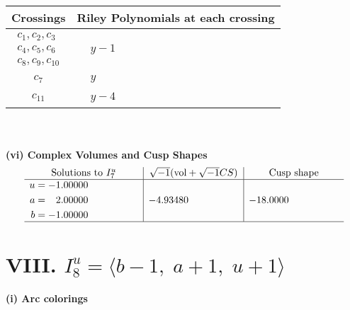 \documentclass[1p]{elsarticle_modified}
\theoremstyle{definition}
\newcommand{\I}{\sqrt{-1}}
\begin{document}
\begin{tabular}{m{50pt}|m{274pt}}
Crossings & \hspace{64pt}Riley Polynomials at each crossing \\
\hline $$\begin{aligned}c_{1},c_{2},c_{3}\\c_{4},c_{5},c_{6}\\c_{8},c_{9},c_{10}\end{aligned}$$&$\begin{aligned}
&y-1
\end{aligned}$\\
\hline $$\begin{aligned}c_{7}\end{aligned}$$&$\begin{aligned}
&y
\end{aligned}$\\
\hline $$\begin{aligned}c_{11}\end{aligned}$$&$\begin{aligned}
&y-4
\end{aligned}$\\
\hline
\end{tabular}\\~\\
\newpage\flushleft \textbf{(vi) Complex Volumes and Cusp Shapes}
$$\begin{array}{c|c|c}  
\text{Solutions to }I^u_{7}& \I (\text{vol} + \sqrt{-1}CS) & \text{Cusp shape}\\
 \hline 
\begin{aligned}
u &= -1.00000\phantom{ +0.000000I} \\
a &= \phantom{-}2.00000\phantom{ +0.000000I} \\
b &= -1.00000\phantom{ +0.000000I}\end{aligned}
 & -4.93480\phantom{ +0.000000I} & -18.0000\phantom{ +0.000000I}\\
 \hline 
 \end{array}$$\newpage\newpage\renewcommand{\arraystretch}{1}
\centering \section*{VIII. $I^u_{8}= \langle b-1,\;a+1,\;u+1 \rangle$}
\flushleft \textbf{(i) Arc colorings}\\
\end{document}
